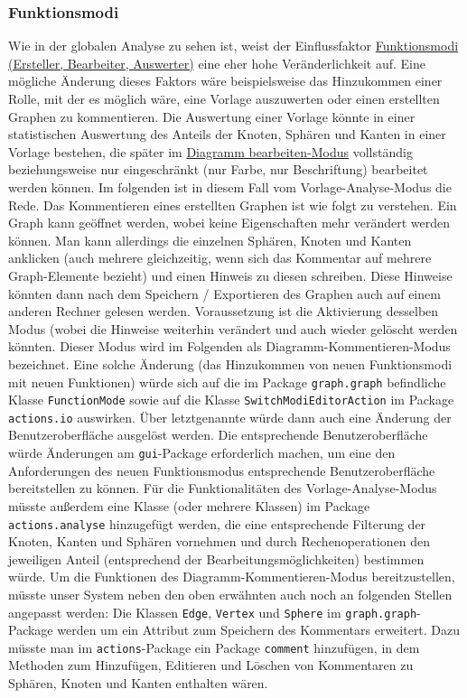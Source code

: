 \documentclass[enabledeprecatedfontcommands,fontsize=11pt,paper=a4,twoside]{scrartcl}
\newcounter{one}
\begin{document}
\subsubsection{Funktionsmodi}
Wie in der globalen Analyse zu sehen ist, weist der Einflussfaktor \hyperlink{z}{Funktionsmodi (Ersteller, Bearbeiter, Auswerter)} eine eher hohe Veränderlichkeit auf. Eine mögliche Änderung dieses Faktors wäre beispielsweise das Hinzukommen einer Rolle, mit der es möglich wäre, eine Vorlage auszuwerten oder einen erstellten Graphen zu kommentieren.
Die Auswertung einer Vorlage könnte in einer statistischen Auswertung des Anteils der Knoten, Sphären und Kanten in einer Vorlage bestehen, die später im \hyperlink{``Diagramm bearbeiten''-Modus}{\glqq Diagramm bearbeiten\grqq-Modus} vollständig beziehungsweise nur eingeschränkt (nur Farbe, nur Beschriftung) bearbeitet werden können. Im folgenden ist in diesem Fall vom Vorlage-Analyse-Modus die Rede.
Das Kommentieren eines erstellten Graphen ist wie folgt zu verstehen. Ein Graph kann geöffnet werden, wobei keine Eigenschaften mehr verändert werden können. Man kann allerdings die einzelnen Sphären, Knoten und Kanten anklicken (auch mehrere gleichzeitig, wenn sich das Kommentar auf mehrere Graph-Elemente bezieht) und einen Hinweis zu diesen schreiben. Diese Hinweise könnten dann nach dem Speichern / Exportieren des Graphen auch auf einem anderen Rechner gelesen werden. Voraussetzung ist die Aktivierung desselben Modus (wobei die Hinweise weiterhin verändert und auch wieder gelöscht werden könnten. Dieser Modus wird im Folgenden als Diagramm-Kommentieren-Modus bezeichnet.
Eine solche Änderung (das Hinzukommen von neuen Funktionsmodi mit neuen Funktionen) würde sich auf die im Package \texttt{graph.graph} befindliche Klasse \texttt{FunctionMode} sowie auf die Klasse \texttt{SwitchModiEditorAction} im Package \texttt{actions.io} auswirken. Über letztgenannte würde dann auch eine Änderung der Benutzeroberfläche ausgelöst werden. Die entsprechende Benutzeroberfläche würde Änderungen am \texttt{gui}-Package erforderlich machen, um eine den Anforderungen des neuen Funktionsmodus entsprechende Benutzeroberfläche bereitstellen zu können.
Für die Funktionalitäten des Vorlage-Analyse-Modus müsste außerdem eine Klasse (oder mehrere Klassen) im Package \texttt{actions.analyse} hinzugefügt werden, die eine entsprechende Filterung der Knoten, Kanten und Sphären vornehmen und durch Rechenoperationen den jeweiligen Anteil (entsprechend der Bearbeitungsmöglichkeiten) bestimmen würde.
Um die Funktionen des Diagramm-Kommentieren-Modus bereitzustellen, müsste unser System neben den oben erwähnten auch noch an folgenden Stellen angepasst werden: Die Klassen \texttt{Edge}, \texttt{Vertex} und \texttt{Sphere} im \texttt{graph.graph}-Package werden um ein Attribut zum Speichern des Kommentars erweitert. Dazu müsste man im \texttt{actions}-Package ein Package \texttt{comment} hinzufügen, in dem Methoden zum Hinzufügen, Editieren und Löschen von Kommentaren zu Sphären, Knoten und Kanten enthalten wären. \\
 
\end{document}

